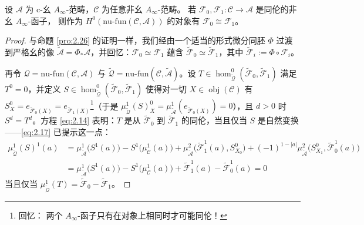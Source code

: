 \begin{Lem}\label{lem:2.28}
设 $\mathcal A$ 为 c-幺 $A_\infty$-范畴，$\mathcal C$ 为任意非幺 $A_\infty$-范畴。
若 $\mathcal F_0,\mathcal F_1:\mathcal C\to\mathcal A$ 是同伦的非幺 $A_\infty$-函子，
则作为 $H^0(\mathrm{nu\text{-}fun}(\mathcal C,\mathcal A))$ 的对象有
$\mathcal F_0\cong\mathcal F_1$。
\end{Lem}

\begin{proof}
与命题 \ref{pro:2.26} 的证明一样，我们经由一个适当的形式微分同胚 $\Phi$ 过渡到严格幺的像
$\tilde{\mathcal A}=\Phi_*\mathcal A$，并回忆：$\mathcal F_0\simeq\mathcal F_1$
蕴含 $\tilde{\mathcal F}_0\simeq\tilde{\mathcal F}_1$，其中
$\tilde{\mathcal F}_i:=\Phi\circ\mathcal F_i$。

再令 $\mathcal Q=\mathrm{nu\text{-}fun}(\mathcal C,\mathcal A)$ 与
$\tilde{\mathcal Q}=\mathrm{nu\text{-}fun}(\mathcal C,\tilde{\mathcal A})$。设
$T\in\hom^0_{\tilde{\mathcal Q}}(\tilde{\mathcal F}_0,\tilde{\mathcal F}_1)$
满足 $T^0=0$，并定义 $S\in\hom^0_{\tilde{\mathcal Q}}(\tilde{\mathcal F}_0,
\tilde{\mathcal F}_1)$ 使得对一切 $X\in\operatorname{obj}(\mathcal C)$ 有
$S^0_X=e_{\tilde{\mathcal F}_0(X)}=e_{\tilde{\mathcal F}_1(X)}$\footnote{回忆：
两个 $A_\infty$-函子只有在对象上相同时才可能同伦！}（于是
$\mu^1_{\tilde{\mathcal Q}}(S)^0_X=\mu^1_{\tilde{\mathcal A}}
(e_{\tilde{\mathcal F}_0(X)})=0$），且 $d>0$ 时 $S^d=T^d$。方程
\eqref{eq:2.14} 表明：$T$ 是从 $\tilde{\mathcal F}_0$ 到 $\tilde{\mathcal F}_1$
的同伦，当且仅当 $S$ 是自然变换——\eqref{eq:2.17} 已提示这一点：
\[
  \begin{aligned}
    \mu^1_{\tilde{\mathcal Q}}(S)^1(a)&=\mu^1_{\tilde{\mathcal A}}\bigl(S^1(a)\bigr)
    -S^1\bigl(\mu^1_{\mathcal C}(a)\bigr)
    +\mu^2_{\tilde{\mathcal A}}\bigl(\tilde{\mathcal F}_1^1(a),S^0_{X_0}\bigr)
    +(-1)^{1-|a|}\mu^2_{\tilde{\mathcal A}}\bigl(S^0_{X_1},
    \tilde{\mathcal F}_0^1(a)\bigr)\\
    &=\mu^1_{\tilde{\mathcal A}}\bigl(S^1(a)\bigr)-S^1\bigl(\mu^1_{\mathcal C}(a)
    \bigr)+\tilde{\mathcal F}_1^1(a)-\tilde{\mathcal F}_0^1(a)=0
  \end{aligned}
\]
当且仅当 $\mu^1_{\tilde{\mathcal Q}}(T)=\tilde{\mathcal F}_0-\tilde{\mathcal F}_1$。


\end{proof}
